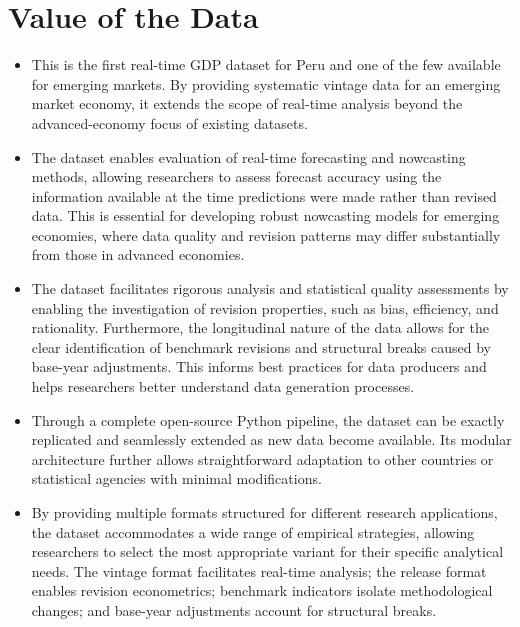 \documentclass[12pt]{article}
\begin{document}
\section*{Value of the Data}


\begin{itemize}[leftmargin=*]

\item This is the first real-time GDP dataset for Peru and one of the few available for emerging markets. By providing systematic vintage data for an emerging market economy, it extends the scope of real-time analysis beyond the advanced-economy focus of existing datasets.

\item The dataset enables evaluation of real-time forecasting and nowcasting methods, allowing researchers to assess forecast accuracy using  the information available at the time predictions were made rather than revised data. This is essential for developing robust nowcasting models for emerging economies, where data quality and revision patterns may differ substantially from those in advanced economies.

\item The dataset facilitates rigorous  analysis and statistical quality assessments by enabling the investigation of revision properties, such as bias, efficiency, and rationality. Furthermore, the longitudinal nature of the data allows for the clear identification of benchmark revisions and structural breaks caused by base-year adjustments. This informs best practices for data producers and helps researchers better understand data generation processes.

\item Through a complete open-source Python pipeline, the dataset can be exactly replicated and seamlessly extended as new data become available. Its modular architecture further allows straightforward adaptation to other countries or statistical agencies with minimal modifications.

\item By providing multiple formats structured for different research applications, the dataset accommodates a wide range of empirical strategies, allowing researchers to select the most appropriate variant for their specific analytical needs. The vintage format facilitates real-time analysis; the release format enables revision econometrics; benchmark indicators isolate methodological changes; and base-year adjustments account for structural breaks.


\end{itemize}
\end{document}
